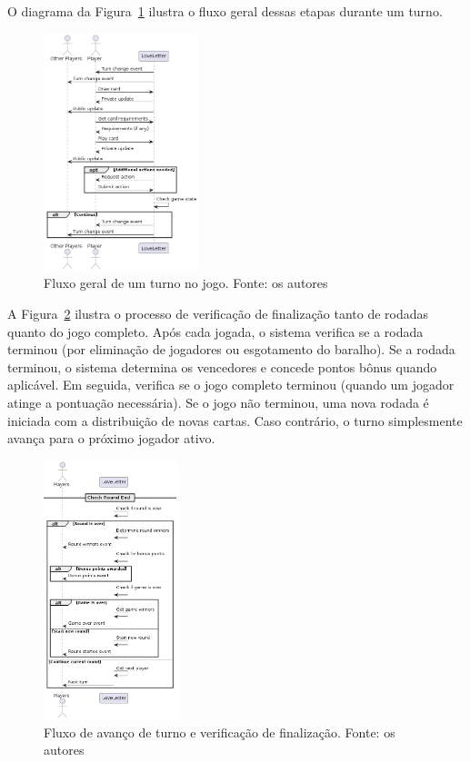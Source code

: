 O diagrama da Figura~\ref{fig:game-turn-flow} ilustra o fluxo geral dessas etapas durante um turno.

\begin{figure}[h]
    \centering
    \includegraphics[width=0.4\textwidth]{diagrams/GameTurnFlow.png}
    \caption{Fluxo geral de um turno no jogo. Fonte: os autores}
    \label{fig:game-turn-flow}
\end{figure}

A Figura~\ref{fig:advance-turn-flow} ilustra o processo de verificação de finalização tanto de rodadas quanto do jogo completo. Após cada jogada, o sistema verifica se a rodada terminou (por eliminação de jogadores ou esgotamento do baralho). Se a rodada terminou, o sistema determina os vencedores e concede pontos bônus quando aplicável. Em seguida, verifica se o jogo completo terminou (quando um jogador atinge a pontuação necessária). Se o jogo não terminou, uma nova rodada é iniciada com a distribuição de novas cartas. Caso contrário, o turno simplesmente avança para o próximo jogador ativo.

\begin{figure}[h]
    \centering
    \includegraphics[width=0.35\textwidth]{diagrams/AdvanceTurnFlow.png}
    \caption{Fluxo de avanço de turno e verificação de finalização. Fonte: os autores}
    \label{fig:advance-turn-flow}
\end{figure}

